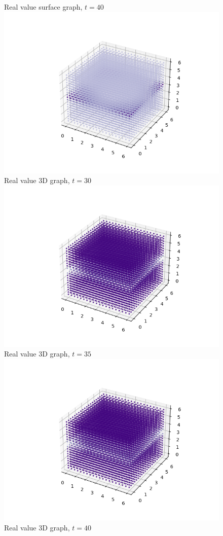 \documentclass[a4paper,8pt]{article}
\begin{document}
\begin{figure}[h!]
\begin{multicols}{2}
Real value surface graph, $t=40$
\includegraphics[width=1\linewidth]{t30real3d}\\
Real value 3D graph, $t=30$
\includegraphics[width=1\linewidth]{t35real3d}\\
Real value 3D graph, $t=35$
\includegraphics[width=1\linewidth]{t40real3d}\\
Real value 3D graph, $t=40$
\end{multicols}
\end{figure}
\end{document}
